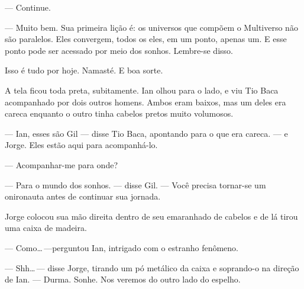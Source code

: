--- Continue.

--- Muito bem. Sua primeira lição é: os universos que compõem o
Multiverso não são paralelos. Eles convergem, todos os eles, em um
ponto, apenas um. E esse ponto pode ser acessado por meio dos sonhos.
Lembre-se disso.

Isso é tudo por hoje. Namasté. E boa sorte.

A tela ficou toda preta, subitamente. Ian olhou para o lado, e viu Tio
Baca acompanhado por dois outros homens. Ambos eram baixos, mas um deles
era careca enquanto o outro tinha cabelos pretos muito volumosos.

--- Ian, esses são Gil --- disse Tio Baca, apontando para o que era
careca. --- e Jorge. Eles estão aqui para acompanhá-lo.

--- Acompanhar-me para onde?

--- Para o mundo dos sonhos. --- disse Gil. --- Você precisa tornar-se
um onironauta antes de continuar sua jornada.

Jorge colocou sua mão direita dentro de seu emaranhado de cabelos e de
lá tirou uma caixa de madeira.

--- Como\ldots\,---perguntou Ian, intrigado com o estranho fenômeno.

--- Shh\ldots\,--- disse Jorge, tirando um pó metálico da caixa e
soprando-o na direção de Ian. --- Durma. Sonhe. Nos veremos do outro
lado do espelho.
